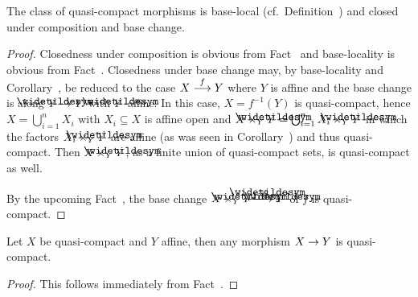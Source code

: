 \documentclass[a4paper,parskip=half,numbers=enddot, DIV=12]{scrreprt}
\begin{document}
\begin{fact}
    The class of quasi-compact morphisms is base-local (cf.\ Definition~) and closed under composition and base change. 
\end{fact}
\begin{proof}
    Closedness under composition is obvious from Fact~ and base-locality is obvious from Fact~. Closedness under base change may, by base-locality and Corollary~, be reduced to the case $X\morphism[f]Y$ where $Y$ is affine and the base change is along $\snake Y\morphism Y$ with $\snake Y$ affine. In this case, $X=f^{-1}(Y)$ is quasi-compact, hence $X=\bigcup_{i=1}^nX_i$ with $X_i\subseteq X$ is affine open and $X\times_Y\snake Y=\bigcup_{i=1}^n X_i\times_Y \snake Y$ in which the factors $X_i\times_Y \snake Y$ are affine (as was seen in Corollary~) and thus quasi-compact. Then $X\times_Y\snake Y$, as a finite union of quasi-compact sets, is quasi-compact as well. 
    
    By the upcoming Fact~, the base change $X\times_Y\snake Y\morphism[\snake f]\snake Y$ of $f$ is quasi-compact.  
\end{proof}
\begin{fact}
    Let $X$ be quasi-compact and $Y$ affine, then any morphism $X\morphism Y$ is quasi-compact.
\end{fact}
\begin{proof}
    This follows immediately from Fact~.
\end{proof}
\end{document}
